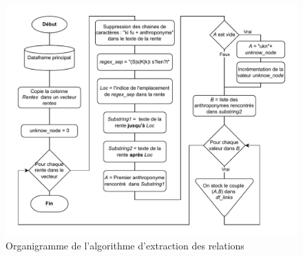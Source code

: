  \begin{figure} %
    \centering
    \includegraphics[scale=0.75]{3.Results/Img/rel.drawio.pdf}
    \caption{Organigramme de l'algorithme d'extraction des relations}
    \label{schemaRelations}
\end{figure}

